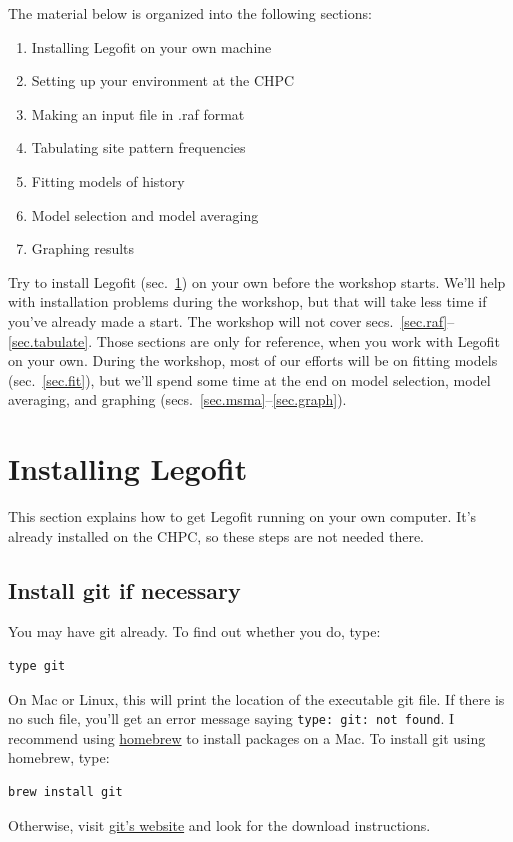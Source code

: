 \documentclass[11pt]{article}
\begin{document}
The material below is organized into the following sections:
\begin{enumerate}
\item[\ref{sec.install}] Installing Legofit on your own machine
\item[\ref{sec.chpc}] Setting up your environment at the CHPC  
\item[\ref{sec.raf}] Making an input file in .raf format
\item[\ref{sec.tabulate}] Tabulating site pattern frequencies
\item[\ref{sec.fit}] Fitting models of history
\item[\ref{sec.msma}] Model selection and model averaging
\item[\ref{sec.graph}] Graphing results
\end{enumerate}
Try to install Legofit (sec.~\ref{sec.install}) on your own before the
workshop starts. We'll help with installation problems during the
workshop, but that will take less time if you've already made a start.
The workshop will not cover
secs.~\ref{sec.raf}--\ref{sec.tabulate}. Those sections are only for
reference, when you work with Legofit on your own. During the
workshop, most of our efforts will be on fitting models
(sec.~\ref{sec.fit}), but we'll spend some time at the end on model
selection, model averaging, and graphing
(secs.~\ref{sec.msma}--\ref{sec.graph}).

\section{Installing Legofit}
\label{sec.install}
This section explains how to get Legofit running on your own
computer. It's already installed on the CHPC, so these steps are not
 needed there.
\subsection{Install git if necessary}
You may have git already. To find out whether you do, type:
\begin{verbatim}
type git
\end{verbatim}
On Mac or Linux, this will print the location of the executable git
file. If there is no such file, you'll get an error message saying
\texttt{type: git: not found}. I recommend using
\href{https://brew.sh}{homebrew} to install packages on a Mac. To
install git using homebrew, type:
\begin{verbatim}
brew install git
\end{verbatim}
Otherwise, visit \href{https://git-scm.com}{git's website} and look
for the download instructions.
\end{document}
